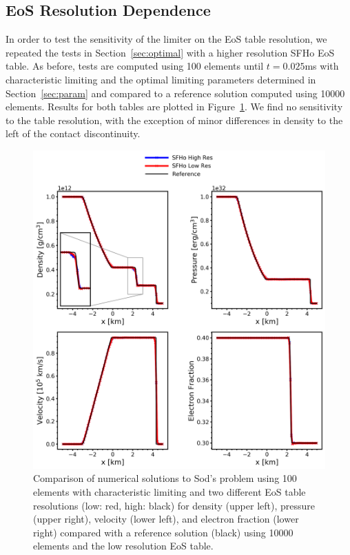 \documentclass[onecolumn]{aastex62}
\begin{document}
\subsection{EoS Resolution Dependence}
\label{sec:EoSRes}
In order to test the sensitivity of the limiter on the EoS table resolution,
we repeated the tests in Section~\ref{sec:optimal} with a higher resolution
SFHo EoS table. As before, tests are computed using 100 elements until
$t = 0.025$ms with characteristic limiting and the optimal limiting parameters determined in
Section~\ref{sec:param} and compared to a reference solution computed using
10000 elements. Results for both tables are plotted in Figure~\ref{fig:SodSedovSFHoRes}.
We find no sensitivity to the table resolution, with the exception of
minor differences in density to the left of the contact discontinuity.
\begin{figure}[h!]
  \centering
  \includegraphics[width=36pc]{./figures/EoS_res.png}
  \caption{\label{fig:SodSedovSFHoRes} Comparison of numerical solutions to
  Sod's problem using 100 elements with characteristic limiting and two
  different EoS table resolutions (low: red, high: black) for density (upper left), pressure (upper right),
  velocity (lower left), and electron fraction (lower right)
  compared with a reference solution (black) using 10000 elements and the low resolution EoS table.}
\end{figure}
\FloatBarrier
\end{document}
